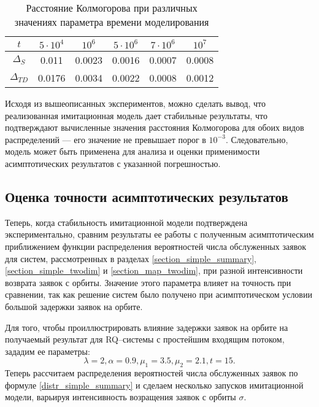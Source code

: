 \begin{table}[h!] 
	\centering
	\caption{Расстояние Колмогорова при различных значениях параметра времени моделирования}
	\label{time_dynamics}
	\begin{tabular}{| c | c | c | c | c | c |} 
		\hline
		$t$ & $5\cdot 10^4$ & $10^6$ & $5\cdot 10^6$ & $7\cdot 10^6$ & $10^7$\\ 
		\hline
		$\Delta_S$ & 0.011 & 0.0023 & 0.0016 & 0.0007 & 0.0008\\
		\hline
		$\Delta_{TD}$ & 0.0176 & 0.0034 & 0.0022 & 0.0008 & 0.0012\\
		\hline
	\end{tabular}
\end{table} 

Исходя из вышеописанных экспериментов, можно сделать вывод, что реализованная имитационная модель дает стабильные результаты, что подтверждают вычисленные значения расстояния Колмогорова для обоих видов распределений --- его значение не превышает порог в $10^{-3}$. Следовательно, модель может быть применена для анализа и оценки применимости асимптотических результатов с указанной погрешностью.
\subsection{Оценка точности асимптотических результатов}
Теперь, когда стабильность имитационной модели подтверждена экспериментально, сравним результаты ее работы с полученным асимптотическим приближением функции распределения вероятностей числа обслуженных заявок для систем, рассмотренных в разделах \ref{section_simple_summary}, \ref{section_simple_twodim} и \ref{section_map_twodim}, при разной интенсивности возврата заявок с орбиты. Значение этого параметра влияет на точность при сравнении, так как решение систем было получено при асимптотическом условии большой задержки заявок на орбите.

Для того, чтобы проиллюстрировать влияние задержки заявок на орбите на получаемый результат для RQ--системы с простейшим входящим потоком, зададим ее параметры:
\begin{equation} \label{simple_summary_input_params}
	\lambda = 2,
	\alpha = 0.9,
	\mu_{1} = 3.5,
	\mu_{2} = 2.1, 
	t = 15.
\end{equation}
Теперь рассчитаем распределения вероятностей числа обслуженных заявок по формуле \eqref{distr_simple_summary} и сделаем несколько запусков имитационной модели, варьируя интенсивность возращения заявок с орбиты $\sigma$.

